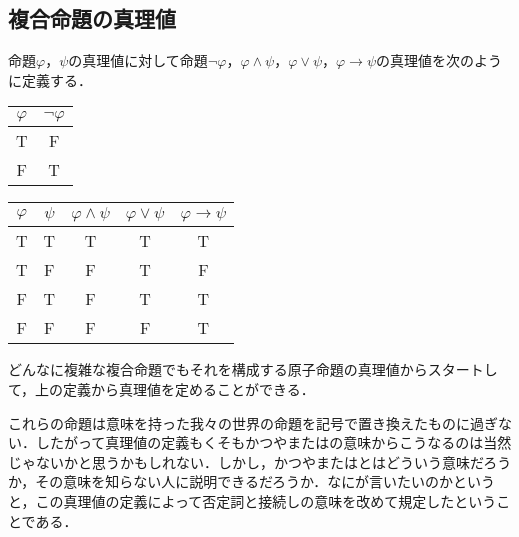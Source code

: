 \documentclass[10pt,b5paper,papersize,dvipdfmx]{jsbook}
\begin{document}
\subsection{複合命題の真理値}
命題$\varphi，\psi$の真理値に対して命題$\lnot\varphi，\varphi\land\psi，\varphi\lor\psi，\varphi\to\psi$の真理値を次のように定義する．\par
\begin{table}[H]
\begin{minipage}[t]{.45\textwidth}
\begin{center}
\begin{tabular}{|c||c|}\hline
$\varphi$&$\lnot\varphi$ \\ \hline \hline
T&F \\ \hline
F&T \\ \hline
\end{tabular}
\end{center}
\end{minipage}
\hfill
\begin{minipage}[t]{.45\textwidth}
\begin{center}
\begin{tabular}{|c|c||c|c|c|}\hline
$\varphi$&$\psi$&$\varphi\land\psi$&$\varphi\lor\psi$&$\varphi\to\psi$ \\ \hline \hline
T&T&T&T&T \\ \hline
T&F&F&T&F \\ \hline
F&T&F&T&T \\ \hline
F&F&F&F&T \\ \hline
\end{tabular}
\end{center}
\end{minipage}
\end{table}
どんなに複雑な複合命題でもそれを構成する原子命題の真理値からスタートして，上の定義から真理値を定めることができる．\par
これらの命題は意味を持った我々の世界の命題を記号で置き換えたものに過ぎない．したがって真理値の定義もくそもかつやまたはの意味からこうなるのは当然じゃないかと思うかもしれない．しかし，かつやまたはとはどういう意味だろうか，その意味を知らない人に説明できるだろうか．なにが言いたいのかというと，この真理値の定義によって否定詞と接続しの意味を改めて規定したということである．
\end{document}
